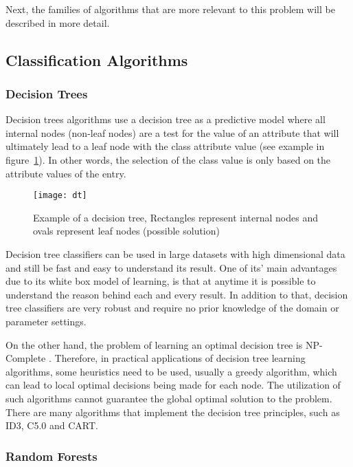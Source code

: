 Next, the families of algorithms that are more relevant to this problem will be
described in more detail.

\subsection{Classification Algorithms}\label{sec:classification}

\subsubsection{Decision Trees}

Decision trees algorithms use a decision tree as a predictive model where all
internal nodes (non-leaf nodes) are a test for the value of an attribute that
will ultimately lead to a leaf node with the class attribute value (see example
in figure~\ref{fig:dtree}). In other words, the selection of the class value is
only based on the attribute values of the entry.\cite{HanKam06}

\begin{figure}[h] \begin{center} \leavevmode
  \texttt{[image: dt]} \caption{Example of a decision
  tree, Rectangles represent internal nodes and ovals represent leaf nodes
(possible solution)\cite{KER:70953}} \label{fig:dtree} \end{center} \end{figure}

Decision tree classifiers can be used in large datasets with high dimensional
data and still be fast and easy to understand its result. One of its' main
advantages due to its white box model of learning, is that at anytime it is
possible to understand the reason behind each and every result. In addition to
that, decision tree classifiers are very robust and require no prior knowledge
of the domain or parameter settings.

On the other hand, the problem of learning an optimal decision tree is
NP-Complete \cite{Hyafil197615}. Therefore, in practical applications of
decision tree learning algorithms, some heuristics need to be used, usually a
greedy algorithm, which can lead to local optimal decisions being made for each
node. The utilization of such algorithms cannot guarantee the global optimal
solution to the problem. There are many algorithms that implement the decision
tree principles, such as ID3, C5.0 and CART.

\subsubsection{Random Forests}

